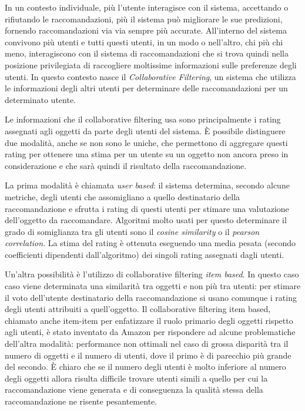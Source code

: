 \documentclass[letterpaper]{article}
\begin{document}
In un contesto individuale, più l'utente interagisce con il sistema, accettando o rifiutando le raccomandazioni, più il sistema può migliorare le sue predizioni, fornendo raccomandazioni via via sempre più accurate. All'interno del sistema convivono più utenti e tutti questi utenti, in un modo o nell'altro, chi più chi meno, interagiscono con il sistema di raccomandazioni che si trova quindi nella posizione privilegiata di raccogliere moltissime informazioni sulle preferenze degli utenti. In questo contesto nasce il \emph{Collaborative Filtering}, un sistema che utilizza le informazioni degli altri utenti per determinare delle raccomandazioni per un determinato utente.

Le informazioni che il collaborative filtering usa sono principalmente i rating assegnati agli oggetti da parte degli utenti del sistema. \`E possibile distinguere due modalità, anche se non sono le uniche, che permettono di aggregare questi rating per ottenere una stima per un utente su un oggetto non ancora preso in considerazione e che sarà quindi il risultato della raccomandazione.

La prima modalità è chiamata \emph{user based}: il sistema determina, secondo alcune metriche, degli utenti che assomigliano a quello destinatario della raccomandazione e sfrutta i rating di questi utenti per stimare una valutazione dell'oggetto da raccomandare. Algoritmi molto usati per questo determinare il grado di somiglianza tra gli utenti sono il \emph{cosine similarity} o il \emph{pearson correlation}. La stima del rating è ottenuta eseguendo una media pesata (secondo coefficienti dipendenti dall'algoritmo) dei singoli rating assegnati dagli utenti.

Un'altra possibilità è l'utilizzo di collaborative filtering \emph{item based}. In questo caso caso viene determinata una similarità tra oggetti e non più tra utenti: per stimare il voto dell'utente destinatario della raccomandazione si usano comunque i rating degli utenti attribuiti a quell'oggetto. Il collaborative filtering item based, chiamato anche item-item per enfatizzare il ruolo primario degli oggetti rispetto agli utenti, è stato inventato da Amazon per rispondere ad alcune problematiche dell'altra modalità: performance non ottimali nel caso di grossa disparità tra il numero di oggetti e il numero di utenti, dove il primo è di parecchio più grande del secondo. \`E chiaro che se il numero degli utenti è molto inferiore al numero degli oggetti allora risulta difficile trovare utenti simili a quello per cui la raccomandazione viene generata e di conseguenza la qualità stessa della raccomandazione ne risente pesantemente.
\end{document}
